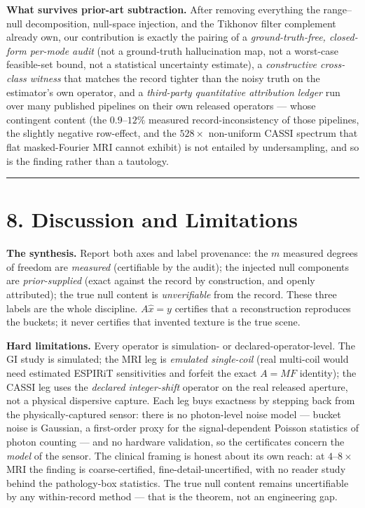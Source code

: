 \documentclass[11pt]{article}
\begin{document}
\textbf{What survives prior-art subtraction.} After removing everything the range--null decomposition, null-space injection, and the Tikhonov filter complement already own, our contribution is exactly the pairing of a \textit{ground-truth-free, closed-form per-mode audit} (not a ground-truth hallucination map, not a worst-case feasible-set bound, not a statistical uncertainty estimate), a \textit{constructive cross-class witness} that matches the record tighter than the noisy truth on the estimator's own operator, and a \textit{third-party quantitative attribution ledger} run over many published pipelines on their own released operators --- whose contingent content (the $0.9$--$12\%$ measured record-inconsistency of those pipelines, the slightly negative row-effect, and the $528\times$ non-uniform CASSI spectrum that flat masked-Fourier MRI cannot exhibit) is not entailed by undersampling, and so is the finding rather than a tautology.

\medskip\hrule\medskip

\section*{8. Discussion and Limitations}

\textbf{The synthesis.} Report both axes and label provenance: the $m$ measured degrees of freedom are \textit{measured} (certifiable by the audit); the injected null components are \textit{prior-supplied} (exact against the record by construction, and openly attributed); the true null content is \textit{unverifiable} from the record. These three labels are the whole discipline. $A\hat{x} = y$ certifies that a reconstruction reproduces the buckets; it never certifies that invented texture is the true scene.

\textbf{Hard limitations.} Every operator is simulation- or declared-operator-level. The GI study is simulated; the MRI leg is \textit{emulated single-coil} (real multi-coil would need estimated ESPIRiT sensitivities and forfeit the exact $A = MF$ identity); the CASSI leg uses the \textit{declared integer-shift} operator on the real released aperture, not a physical dispersive capture. Each leg buys exactness by stepping back from the physically-captured sensor: there is no photon-level noise model --- bucket noise is Gaussian, a first-order proxy for the signal-dependent Poisson statistics of photon counting --- and no hardware validation, so the certificates concern the \textit{model} of the sensor. The clinical framing is honest about its own reach: at $4$--$8\times$ MRI the finding is coarse-certified, fine-detail-uncertified, with no reader study behind the pathology-box statistics. The true null content remains uncertifiable by any within-record method --- that is the theorem, not an engineering gap.
\end{document}
